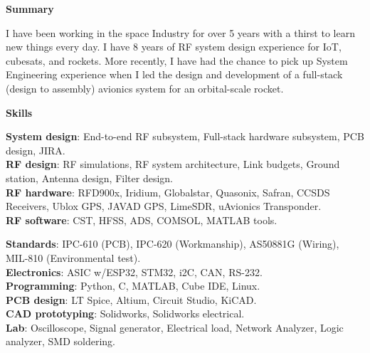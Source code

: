\documentclass[10pt,A4]{article}
\newcommand{\cvsection}[1]
{
	\begin{center}
		\large\textcolor{sectcol}{\textbf{#1}}
	\end{center}
}
\begin{document}
\cvsection{Summary}
\vspace{-5pt}
I have been working in the space Industry for over 5 years with a thirst to learn new things every day. I have 8 years of RF system design experience for IoT, cubesats, and rockets. More recently, I have had the chance to pick up System Engineering experience when I led the design and development of a full-stack (design to assembly) avionics system for an orbital-scale rocket. 
\vspace{-2pt}
\cvsection{Skills}
\vspace{-15pt}
\begin{multicols}{2}
\textbf{System design}: End-to-end RF subsystem, Full-stack hardware subsystem, PCB design, JIRA. \\
\textbf{RF design}: RF simulations, RF system architecture, Link budgets, Ground station, Antenna design, Filter design. \\
\textbf{RF hardware}: RFD900x, Iridium, Globalstar, Quasonix, Safran, CCSDS Receivers, Ublox GPS, JAVAD GPS, LimeSDR, uAvionics Transponder. \\
\textbf{RF software}: CST, HFSS, ADS, COMSOL, MATLAB tools.

\columnbreak

\textbf{Standards}: IPC-610 (PCB), IPC-620 (Workmanship), AS50881G (Wiring), MIL-810 (Environmental test). \\
\textbf{Electronics}: ASIC w/ESP32, STM32, i2C, CAN, RS-232. \\
\textbf{Programming}: Python, C, MATLAB, Cube IDE, Linux. \\
\textbf{PCB design}: LT Spice, Altium, Circuit Studio, KiCAD. \\
\textbf{CAD prototyping}: Solidworks, Solidworks electrical. \\
\textbf{Lab}: Oscilloscope, Signal generator, Electrical load, Network Analyzer, Logic analyzer, SMD soldering. 
\end{multicols}

%
%

\end{document}
